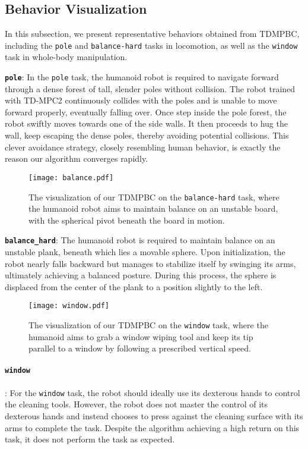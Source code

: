 \subsection{Behavior Visualization} 
In this subsection, we present representative behaviors obtained from TDMPBC, including the \texttt{pole} and \texttt{balance-hard} tasks in locomotion, as well as the \texttt{window} task in whole-body manipulation.



\textbf{\texttt{pole}}: In the \texttt{pole} task, the humanoid robot is required to navigate forward through a dense forest of tall, slender poles without collision. 
The robot trained with TD-MPC2 continuously collides with the poles and is unable to move forward properly, eventually falling over.
Once step inside the pole forest, the robot swiftly moves towards one of the side walls. 
It then proceeds to hug the wall, keep escaping the dense poles, thereby avoiding potential collisions. 
This clever avoidance strategy, closely resembling human behavior, is exactly the reason our algorithm converges rapidly.

\begin{figure}[h]
    \centering
    \texttt{[image: balance.pdf]}
    \caption{The visualization of our TDMPBC on the \texttt{balance-hard} task, where the humanoid robot aims to maintain balance on an unstable board, with the spherical pivot beneath the board in motion.}
    \label{fig:balance}
\end{figure}
\textbf{\texttt{balance\_hard}}: The humanoid robot is required to maintain balance on an unstable plank, beneath which lies a movable sphere. Upon initialization, the robot nearly falls backward but manages to stabilize itself by swinging its arms, ultimately achieving a balanced posture. During this process, the sphere is displaced from the center of the plank to a position slightly to the left.






\begin{figure}[h]
    \centering
    \texttt{[image: window.pdf]}
    \vspace{-6pt}
    \caption{The visualization of our TDMPBC on the \texttt{window} task, where the humanoid aims to grab a window wiping tool and keep its tip parallel to a window by following a prescribed vertical speed.}
    \label{fig:window}
    \vspace{-8pt}
\end{figure}
\paragraph{\texttt{window}}: For the \texttt{window} task, the robot should ideally use its dexterous hands to control the cleaning tools. 
However, the robot does not master the control of its dexterous hands and instead chooses to press against the cleaning surface with its arms to complete the task. 
Despite the algorithm achieving a high return on this task, it does not perform the task as expected.

